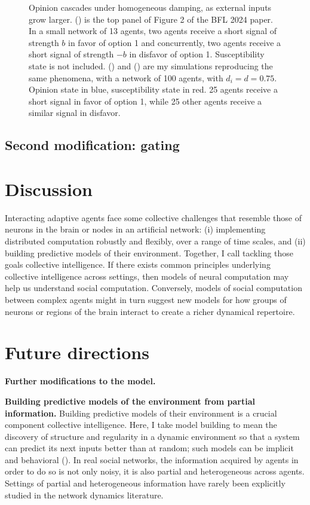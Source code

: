 \documentclass[]{article}
\begin{document}
\begin{figure}
	\caption{Opinion cascades under homogeneous damping, as external inputs grow larger. () is the top panel of Figure 2 of the BFL 2024 paper. In a small network of 13 agents, two agents receive a short signal of strength $b$ in favor of option 1 and concurrently, two agents receive a short signal of strength $-b$ in disfavor of option 1. Susceptibility state is not included. () and () are my simulations reproducing the same phenomena, with a network of 100 agents, with $d_i=d=0.75$. Opinion state in blue, susceptibility state in red. 25 agents receive a short signal in favor of option 1, while 25 other agents receive a similar signal in disfavor. }\label{fig:homdamping}
\end{figure}



\subsection{Second modification: gating}



\section{Discussion}

Interacting adaptive agents face some collective challenges that resemble those of neurons in the brain or nodes in an artificial network: (i) implementing distributed computation robustly and flexibly, over a range of time scales, and (ii) building predictive models of their environment. Together, I call tackling those goals collective intelligence. If there exists common principles underlying collective intelligence across settings, then models of neural computation may help us understand social computation. Conversely, models of social computation between complex agents might in turn suggest new models for how groups of neurons or regions of the brain interact to create a richer dynamical repertoire.

\newpage

\section{Future directions}

\textbf{Further modifications to the model.}


\textbf{Building predictive models of the environment from partial information.} Building predictive models of their environment is a crucial component collective intelligence. Here, I take model building to mean the discovery of structure and regularity in a dynamic environment so that a system can predict its next inputs better than at random; such models can be implicit and behavioral (\cite{crutchfieldCalculiEmergenceComputation1994}). In real social networks, the information acquired by agents in order to do so is not only noisy, it is also partial and heterogeneous across agents. Settings of partial and heterogeneous information have rarely been explicitly studied in the network dynamics literature.
\end{document}
